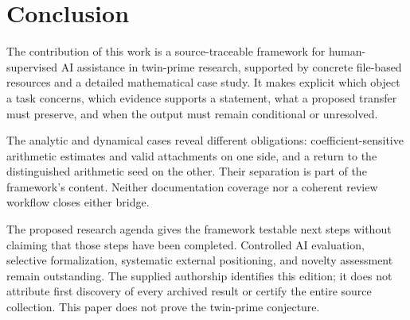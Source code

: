 \section{Conclusion}
The contribution of this work is a source-traceable framework for human-supervised AI assistance in twin-prime research, supported by concrete file-based resources and a detailed mathematical case study. It makes explicit which object a task concerns, which evidence supports a statement, what a proposed transfer must preserve, and when the output must remain conditional or unresolved.

The analytic and dynamical cases reveal different obligations: coefficient-sensitive arithmetic estimates and valid attachments on one side, and a return to the distinguished arithmetic seed on the other. Their separation is part of the framework's content. Neither documentation coverage nor a coherent review workflow closes either bridge.

The proposed research agenda gives the framework testable next steps without claiming that those steps have been completed. Controlled AI evaluation, selective formalization, systematic external positioning, and novelty assessment remain outstanding. The supplied authorship identifies this edition; it does not attribute first discovery of every archived result or certify the entire source collection. This paper does not prove the twin-prime conjecture.
